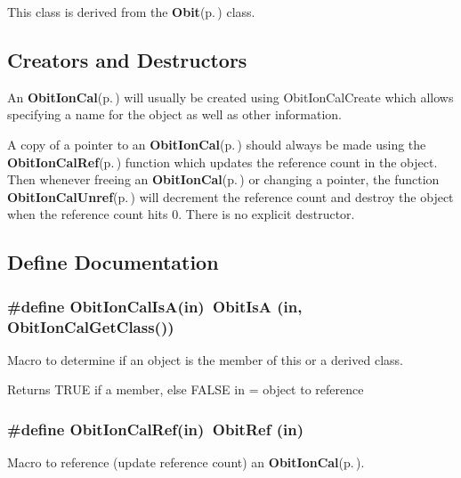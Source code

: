 This class is derived from the {\bf Obit}{\rm (p.\,\pageref{structObit})} class.\subsection{Creators and Destructors}\label{ObitIonCal_8h_ObitIonCalaccess}
An {\bf Obit\-Ion\-Cal}{\rm (p.\,\pageref{structObitIonCal})} will usually be created using Obit\-Ion\-Cal\-Create which allows specifying a name for the object as well as other information.

A copy of a pointer to an {\bf Obit\-Ion\-Cal}{\rm (p.\,\pageref{structObitIonCal})} should always be made using the {\bf Obit\-Ion\-Cal\-Ref}{\rm (p.\,\pageref{ObitIonCal_8h_a1})} function which updates the reference count in the object. Then whenever freeing an {\bf Obit\-Ion\-Cal}{\rm (p.\,\pageref{structObitIonCal})} or changing a pointer, the function {\bf Obit\-Ion\-Cal\-Unref}{\rm (p.\,\pageref{ObitIonCal_8h_a0})} will decrement the reference count and destroy the object when the reference count hits 0. There is no explicit destructor.

\subsection{Define Documentation}
\subsubsection{\setlength{\rightskip}{0pt plus 5cm}\#define Obit\-Ion\-Cal\-Is\-A(in)\ Obit\-Is\-A (in, Obit\-Ion\-Cal\-Get\-Class())}\label{ObitIonCal_8h_a2}


Macro to determine if an object is the member of this or a derived class. 

Returns TRUE if a member, else FALSE in = object to reference 
\subsubsection{\setlength{\rightskip}{0pt plus 5cm}\#define Obit\-Ion\-Cal\-Ref(in)\ Obit\-Ref (in)}\label{ObitIonCal_8h_a1}


Macro to reference (update reference count) an {\bf Obit\-Ion\-Cal}{\rm (p.\,\pageref{structObitIonCal})}. 

